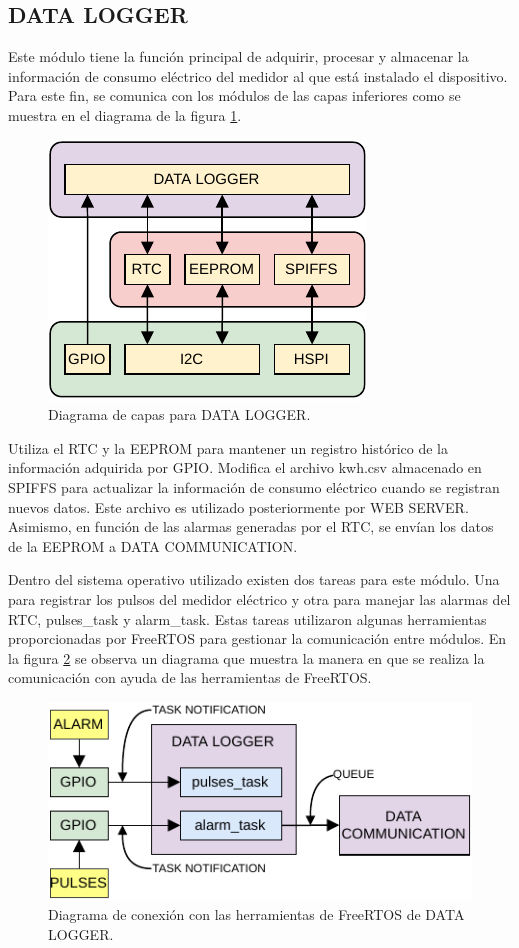\subsection{DATA LOGGER}

Este módulo tiene la función principal de adquirir, procesar y almacenar la información de consumo eléctrico del medidor al que está instalado el dispositivo. Para este fin, se comunica con los módulos de las capas inferiores como se muestra en el diagrama de la figura \ref{fig:dataLayers}.

\begin{figure}[h]
	\centering
	\includegraphics[scale=1]{./Figures/data_logger_diagram.pdf}
	\caption{Diagrama de capas para DATA LOGGER.}
		\label{fig:dataLayers}
\end{figure}

Utiliza el RTC y la EEPROM para mantener un registro histórico de la información adquirida por GPIO. Modifica el archivo kwh.csv almacenado en SPIFFS para actualizar la información de consumo eléctrico cuando se registran nuevos datos. Este archivo es utilizado posteriormente por WEB SERVER. Asimismo, en función de las alarmas generadas por el RTC, se envían los datos de la EEPROM a DATA COMMUNICATION.

Dentro del sistema operativo utilizado existen dos tareas para este módulo. Una para registrar los pulsos del medidor eléctrico y otra para manejar las alarmas del RTC, pulses\_task y alarm\_task. Estas tareas utilizaron algunas herramientas proporcionadas por FreeRTOS para gestionar la comunicación entre módulos. En la figura \ref{fig:dataRTOS} se observa un diagrama que muestra la manera en que se realiza la comunicación con ayuda de las herramientas de FreeRTOS.

\begin{figure}[h]
	\centering
	\includegraphics[scale=1]{./Figures/data_logger_com.pdf}
	\caption{Diagrama de conexión con las herramientas de FreeRTOS de DATA LOGGER.}
		\label{fig:dataRTOS}
\end{figure}

